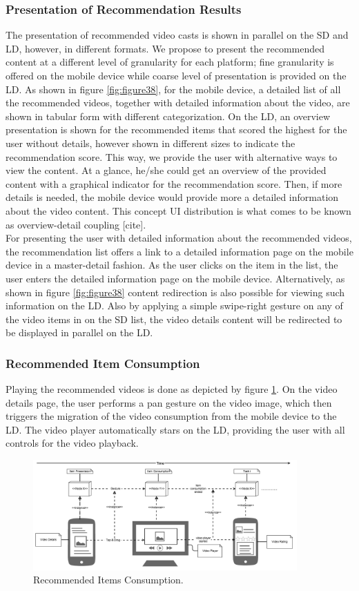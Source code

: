 \subsubsection{Presentation of Recommendation Results}
The presentation of recommended video casts is shown in parallel on the SD and LD, however, in different formats. We propose to present the recommended content at a different level of granularity for each platform; fine granularity is offered on the mobile device while coarse level of presentation is provided on the LD. As shown in figure \ref{fig:figure38}, for the mobile device, a detailed list of all the recommended videos, together with detailed information about the video, are shown in tabular form with different categorization. On the LD, an overview presentation is shown for the recommended items that scored the highest for the user without details, however shown in different sizes to indicate the recommendation score.
This way, we provide the user with alternative ways to view the content. At a glance, he/she could get an overview of the provided content with a graphical indicator for the recommendation score. Then, if more details is needed, the mobile device would provide more a detailed information about the video content. This concept UI distribution is what comes to be known as overview-detail coupling [cite].\\ 
For presenting the user with detailed information about the recommended videos, the recommendation list offers a link to a detailed information page on the mobile device in a master-detail fashion. As the user clicks on the item in the list, the user enters the detailed information page on the mobile device. Alternatively, as shown in figure \ref{fig:figure38} content redirection is also possible for viewing such information on the LD. Also by applying a simple swipe-right gesture on any of the video items in on the SD list, the video details content will be redirected to be displayed in parallel on the LD.   
    
\subsubsection{Recommended Item Consumption}
Playing the recommended videos is done as depicted by figure \ref{fig:figure36}. On the video details page, the user performs a pan gesture on the video image,  which then triggers the migration of the video consumption from the mobile device to the LD. The video player automatically stars on the LD, providing the user with all controls for the video playback.  
\begin{figure}[h!]
\includegraphics[width=0.9\textwidth, inner, center]{playrate}
\caption{Recommended Items Consumption.}
\label{fig:figure36}
\end{figure}
